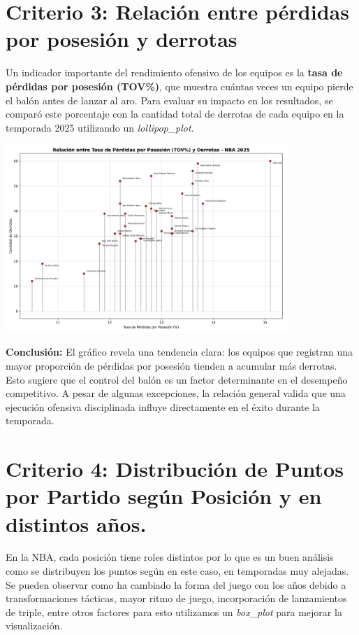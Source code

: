 \documentclass[12pt]{article}
\begin{document}
\section*{Criterio 3: Relación entre pérdidas por posesión y derrotas}

Un indicador importante del rendimiento ofensivo de los equipos es la \textbf{tasa de pérdidas por posesión (TOV\%)}, que muestra cuántas veces un equipo pierde el balón antes de lanzar al aro. Para evaluar su impacto en los resultados, se comparó este porcentaje con la cantidad total de derrotas de cada equipo en la temporada 2025 utilizando un \textit{lollipop_plot}.

\begin{center}
    \includegraphics[width=0.8\textwidth]{lollipop_plot_tov_vs_derrotas.png}
\end{center}

\textbf{Conclusión:} El gráfico revela una tendencia clara: los equipos que registran una mayor proporción de pérdidas por posesión tienden a acumular más derrotas. Esto sugiere que el control del balón es un factor determinante en el desempeño competitivo. A pesar de algunas excepciones, la relación general valida que una ejecución ofensiva disciplinada influye directamente en el éxito durante la temporada.

\section*{Criterio 4: Distribución de Puntos por Partido según Posición y en distintos años.}

En la NBA, cada posición tiene roles distintos por lo que es un buen análisis como se distribuyen los puntos según en este caso, en temporadas muy alejadas. Se pueden observar como ha cambiado la forma del juego con los años debido a transformaciones tácticas, mayor ritmo de juego, incorporación de lanzamientos de triple, entre otros factores para esto utilizamos un \textit{box_plot} para mejorar la visualización.
\end{document}
